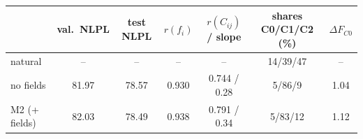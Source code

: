 \begin{tabular}{lcccccc}
\toprule
 & val.\ NLPL & test NLPL & $r(f_i)$ & $r(C_{ij})$ / slope & shares C0/C1/C2 (\%) & $\Delta F_{C0}$ \\
\midrule
natural & -- & -- & -- & -- & 14/39/47 & -- \\
no fields & 81.97 & 78.57 & 0.930 & 0.744 / 0.28 & 5/86/9 & 1.04 \\
M2 (+ fields) & 82.03 & 78.49 & 0.938 & 0.791 / 0.34 & 5/83/12 & 1.12 \\
\bottomrule
\end{tabular}

